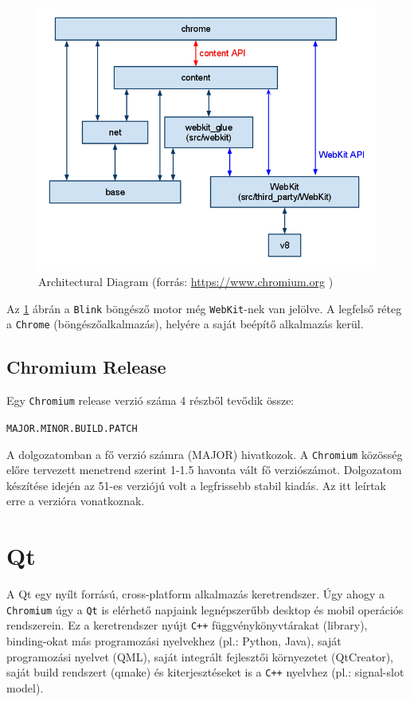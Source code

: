 \documentclass[12pt]{report}
\let\origurl\url
\renewcommand{\url}[1]{%
    \textcolor{blue}{\origurl{#1}}
}
\begin{document}
\begin{figure}[h]
    \centering
    \includegraphics[scale=0.6]{chromium_architecture}
    \caption{
        \label{fig-chromium-architecture}
        Architectural Diagram
        (forrás: \url{https://www.chromium.org} \cite{bib-chromium-content-module})
    }
\end{figure}

Az \ref{fig-chromium-architecture} ábrán a \texttt{Blink} böngésző motor még
\texttt{WebKit}-nek van jelölve.
A legfelső réteg a \texttt{Chrome} (böngészőalkalmazás), helyére a saját beépítő alkalmazás
kerül.

\subsection{Chromium Release}
Egy \texttt{Chromium} release verzió száma 4 részből tevődik össze:
\begin{center}
    \texttt{MAJOR.MINOR.BUILD.PATCH}
\end{center}
A dolgozatomban a fő verzió számra (MAJOR) hivatkozok.
A \texttt{Chromium} közösség előre tervezett menetrend szerint 1-1.5 havonta vált fő
verziószámot. Dolgozatom készítése idején az 51-es verziójú volt a legfrissebb stabil kiadás.
Az itt leírtak erre a verzióra vonatkoznak.


\section{Qt}
A Qt egy nyílt forrású, cross-platform alkalmazás keretrendszer. Úgy ahogy a
\texttt{Chromium} úgy a \texttt{Qt} is elérhető napjaink legnépszerűbb desktop és mobil
operációs rendszerein. Ez a keretrendszer nyújt \texttt{C++} függvénykönyvtárakat (library),
binding-okat más programozási nyelvekhez (pl.: Python, Java), saját programozási nyelvet
(QML), saját integrált fejlesztői környezetet (QtCreator), saját build rendszert
(qmake) és kiterjesztéseket is a \texttt{C++} nyelvhez (pl.: signal-slot model).
\cite{bib-qt-wiki-about-qt}
\end{document}
